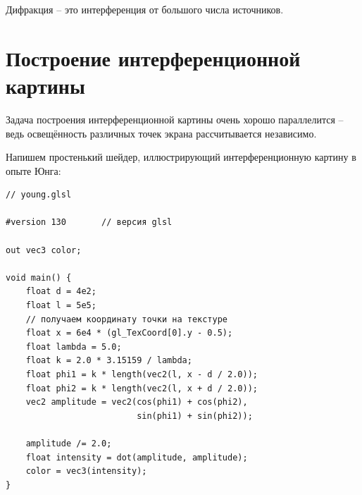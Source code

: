 Дифракция -- это интерференция от большого числа источников.

\section{Построение интерференционной картины}
Задача построения интерференционной картины очень хорошо параллелится -- ведь
освещённость различных точек экрана рассчитывается независимо.

Напишем простенький шейдер, иллюстрирующий интерференционную картину в опыте Юнга:

\begin{lstlisting}
// young.glsl

#version 130       // версия glsl

out vec3 color;

void main() {
    float d = 4e2;
    float l = 5e5;
    // получаем координату точки на текстуре
    float x = 6e4 * (gl_TexCoord[0].y - 0.5);
    float lambda = 5.0;
    float k = 2.0 * 3.15159 / lambda;
    float phi1 = k * length(vec2(l, x - d / 2.0));
    float phi2 = k * length(vec2(l, x + d / 2.0));
    vec2 amplitude = vec2(cos(phi1) + cos(phi2),
                          sin(phi1) + sin(phi2));

    amplitude /= 2.0;
    float intensity = dot(amplitude, amplitude);
    color = vec3(intensity);
}
\end{lstlisting}


